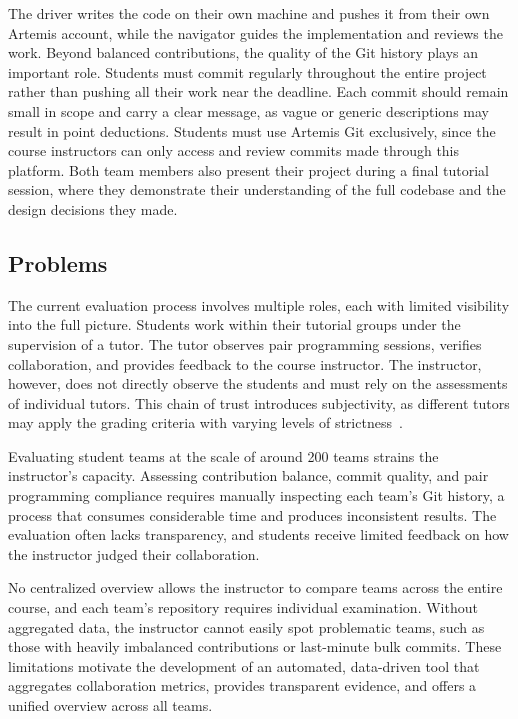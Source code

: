 \documentclass[sigconf]{acmart}
\begin{document}
The driver writes the code on their own machine and pushes it from their own Artemis account, while the navigator guides the implementation and reviews the work. Beyond balanced contributions, the quality of the Git history plays an important role. Students must commit regularly throughout the entire project rather than pushing all their work near the deadline. Each commit should remain small in scope and carry a clear message, as vague or generic descriptions may result in point deductions. Students must use Artemis Git exclusively, since the course instructors can only access and review commits made through this platform. Both team members also present their project during a final tutorial session, where they demonstrate their understanding of the full codebase and the design decisions they made.

\subsection{Problems}

The current evaluation process involves multiple roles, each with limited visibility into the full picture. Students work within their tutorial groups under the supervision of a tutor. The tutor observes pair programming sessions, verifies collaboration, and provides feedback to the course instructor. The instructor, however, does not directly observe the students and must rely on the assessments of individual tutors. This chain of trust introduces subjectivity, as different tutors may apply the grading criteria with varying levels of strictness~\cite{kopec2023impact}.

Evaluating student teams at the scale of around 200 teams strains the instructor's capacity. Assessing contribution balance, commit quality, and pair programming compliance requires manually inspecting each team's Git history, a process that consumes considerable time and produces inconsistent results. The evaluation often lacks transparency, and students receive limited feedback on how the instructor judged their collaboration.

No centralized overview allows the instructor to compare teams across the entire course, and each team's repository requires individual examination. Without aggregated data, the instructor cannot easily spot problematic teams, such as those with heavily imbalanced contributions or last-minute bulk commits. These limitations motivate the development of an automated, data-driven tool that aggregates collaboration metrics, provides transparent evidence, and offers a unified overview across all teams.
\end{document}
